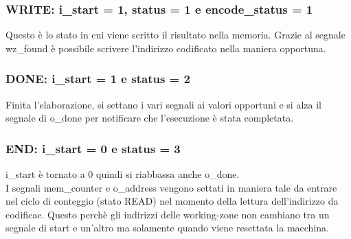\documentclass{article}
\begin{document}
\subsubsection{WRITE: {\selectfont i\_start} = 1, {\selectfont status} = 1 e {\selectfont encode\_status} = 1}
Questo è lo stato in cui viene scritto il risultato nella memoria. Grazie al segnale {\selectfont wz\_found} è possibile scrivere l'indirizzo codificato nella maniera opportuna.
\subsubsection{DONE: {\selectfont i\_start} = 1 e {\selectfont status} = 2}
Finita l'elaborazione, si settano i vari segnali ai valori opportuni e si alza il segnale di {\selectfont o\_done} per notificare che l'esecuzione è stata completata.
\subsubsection{END: {\selectfont i\_start} = 0 e {\selectfont status} = 3}
{\selectfont i\_start} è tornato a 0 quindi si riabbassa anche {\selectfont o\_done}.\\
I segnali {\selectfont mem\_counter} e {\selectfont o\_address} vengono settati in maniera tale da entrare nel ciclo di conteggio (stato READ) nel momento della lettura dell'indirizzo da codificae. Questo perchè gli indirizzi delle working-zone non cambiano tra un segnale di start e un'altro ma solamente quando viene resettata la macchina.
\pagebreak
\end{document}
